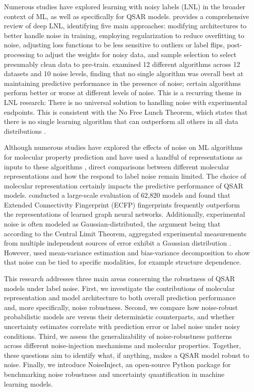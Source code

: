 \documentclass[pdflatex,sn-basic]{sn-jnl}%
\theoremstyle{thmstyleone}%
\theoremstyle{thmstyletwo}%
\theoremstyle{thmstylethree}%
\begin{document}
Numerous studies have explored learning with noisy labels (LNL) in the broader context of ML, as well as specifically for QSAR models. \citet{Song2022} provides a comprehensive review of deep LNL, identifying five main approaches: modifying architectures to better handle noise in training, employing regularization to reduce overfitting to noise, adjusting loss functions to be less sensitive to outliers or label flips, post-processing to adjust the weights for noisy data, and sample selection to select presumably clean data to pre-train. \citet{Cortes2015} examined 12 different algorithms across 12 datasets and 10 noise levels, finding that no single algorithm was overall best at maintaining predictive performance in the presence of noise; certain algorithms perform better or worse at different levels of noise. This is a recurring theme in LNL research: There is no universal solution to handling noise with experimental endpoints. This is consistent with the No Free Lunch Theorem, which states that there is no single learning algorithm that can outperform all others in all data distributions \citep{Wolpert1997}. 

Although numerous studies have explored the effects of noise on ML algorithms for molecular property prediction and have used a handful of representations as inputs to these algorithms \citep{Kolmar2021}, direct comparisons between different molecular representations and how the respond to label noise remain limited. The choice of molecular representation certainly impacts the predictive performance of QSAR models. \citet{Deng2023} conducted a large-scale evaluation of 62,820 models and found that Extended Connectivity Fingerprint (ECFP) fingerprints frequently outperform the representations of  learned graph neural networks. Additionally, experimental noise is often modeled as Gaussian-distributed, the argument being that according to the Central Limit Theorem, aggregated experimental measurements from multiple independent sources of error exhibit a Gaussian distribution \citep{Kolmar2021}. However, \citet{Heid2023} used mean-variance estimation and bias-variance decomposition to show that noise can be tied to specific modalities, for example structure dependence. 

This research addresses three main areas concerning the robustness of QSAR models under label noise. First, we investigate the contributions of molecular representation and model architecture to both overall prediction performance and, more specifically, noise robustness. Second, we compare how noise-robust probabilistic models are versus their deterministic counterparts, and whether uncertainty estimates correlate with prediction error or label noise under noisy conditions. Third, we assess the generalizability of noise-robustness patterns across different noise-injection mechanisms and molecular properties. Together, these questions aim to identify what, if anything, makes a QSAR model robust to noise. Finally, we introduce NoiseInject, an open-source Python package for benchmarking noise robustness and uncertainty quantification in machine learning models.
\end{document}

